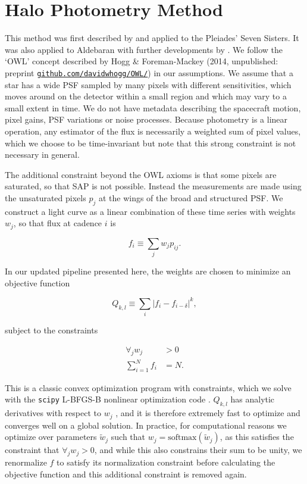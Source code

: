 \documentclass[modern]{aastex62}
\begin{document}
\section{Halo Photometry Method}
\label{method}


This method was first described by \citet{White2017} and applied to the Pleiades' Seven Sisters. It was also applied to Aldebaran with further developments by \citet{Farr2018}. We follow the `OWL' concept described by Hogg \&  Foreman-Mackey (2014, unpublished: preprint  \href{https://github.com/davidwhogg/OWL/}{\nolinkurl{github.com/davidwhogg/OWL/}}) in our assumptions. We assume that a star has a wide PSF sampled by many pixels with different sensitivities, which moves around on the detector within a small region and which may vary to a small extent in time. We do not have metadata describing the spacecraft motion, pixel gains, PSF variations or noise processes. Because photometry is a linear operation, any estimator of the flux is necessarily a weighted sum of pixel values, which we choose to be time-invariant but note that this strong constraint is not necessary in general. 

The additional constraint beyond the OWL axioms is that some pixels are saturated, so that SAP is not possible. Instead the measurements are made using the unsaturated pixels $p_j$ at the wings of the broad and structured PSF. We construct a light curve as a linear combination of these time series with weights $w_j$, so that flux at cadence $i$ is 

\begin{equation}
    f_i \equiv \sum_j {w_j p_{ij}}.
\end{equation}

\noindent In our updated pipeline presented here, the weights are chosen to minimize an objective function

\begin{equation}
    Q_{k,l} \equiv {\sum_i{|f_i - f_{i-\delta}|^k}},
\end{equation}

\noindent subject to the constraints 

\begin{align}
\forall_j w_j &> 0\\
\sum_{i=1}^{N} f_i  &= N.
\end{align}

This is a classic convex optimization program with constraints, which we solve with the \texttt{scipy} \citep{scipy} L-BFGS-B nonlinear optimization code \citep{lbfgsb}. $Q_{k,l}$ has analytic derivatives with respect to $w_j$ \citep[calculated with \texttt{autograd};][]{autograd}, and it is therefore extremely fast to optimize and converges well on a global solution. In practice, for computational reasons we optimize over parameters $\tilde{w}_j$ such that $w_j = \text{softmax}(\tilde{w}_j)$, as this satisfies the constraint that $\forall_j w_j > 0$, and while this also constrains their sum to be unity, we renormalize $f$ to satisfy its normalization constraint before calculating the objective function and this additional constraint is removed again.
\end{document}
